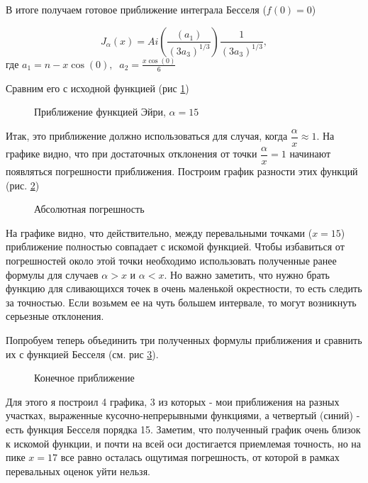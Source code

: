 \documentclass[14pt]{extarticle}
\begin{document}
В итоге получаем готовое приближение интеграла Бесселя ($f(0)=0$)

\begin{equation}\label{eq:eq19}
J_\alpha(x) = Ai\left(\frac{(a_1)}{(3 a_3)^{1/3}}\right) \frac{1}{(3 a_3)^{1/3}},
\end{equation}
где $a_1=n-x\cos(0), \;\; a_2=\frac{x\cos(0)}{6}$

Сравним его с исходной функцией (рис \ref{ris:image7})

\begin{figure}[h!]
	\caption{Приближение функцией Эйри, $\alpha=15$}
	\label{ris:image7}
\end{figure}

Итак, это приближение должно использоваться для случая, когда $\dfrac{\alpha}{x} \approx 1$. На графике видно, что при достаточных отклонения от точки $\dfrac{\alpha}{x} =1$ начинают появляться погрешности приближения. Построим график разности этих функций (рис. \ref{ris:image8})

\begin{figure}[h!]
	\caption{Абсолютная погрешность}
	\label{ris:image8}
\end{figure}
  
На графике видно, что действительно, между перевальными точками ($x=15$) приближение полностью совпадает с искомой функцией. Чтобы избавиться от погрешностей около этой точки необходимо использовать полученные ранее формулы для случаев $\alpha>x$ и $\alpha<x$.  Но важно заметить, что нужно брать функцию для сливающихся точек в очень маленькой окрестности, то есть следить за точностью. Если возьмем ее на чуть большем интервале, то могут возникнуть серьезные отклонения.

Попробуем теперь объединить три полученных формулы приближения и сравнить их с функцией Бесселя (см. рис \ref{ris:image10}). 
  
\begin{figure}[h!]
	\caption{Конечное приближение}
	\label{ris:image10}
\end{figure}

Для этого я построил 4 графика, 3 из которых - мои приближения на разных участках, выраженные кусочно-непрерывными функциями, а четвертый (синий) - есть функция Бесселя порядка 15. Заметим, что полученный график очень близок к искомой функции, и почти на всей оси достигается приемлемая точность, но на пике $x=17$ все равно осталась ощутимая погрешность, от которой в рамках перевальных оценок уйти нельзя.
\end{document}
